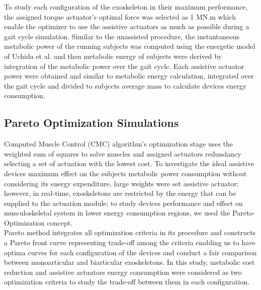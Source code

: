 \documentclass[10pt,letterpaper]{article}
\begin{document}
To study each configuration of the exoskeleton in their maximum performance, the assigned torque actuator's optimal force was selected as 1 MN.m which enable the optimizer to use the assistive actuators as much as possible during a gait cycle simulation. Similar to the unassisted procedure, the instantaneous metabolic power of the running subjects was computed using the energetic model of Uchida et al. \cite{106} and then metabolic energy of subjects were derived by integration of the metabolic power over the gait cycle. Each assistive actuator power were obtained and similar to metabolic energy calculation, integrated over the gait cycle and divided to subjects average mass to calculate devices energy consumption.\\
\subsection*{Pareto Optimization Simulations}
Computed Muscle Control (CMC) algorithm's optimization stage uses the weighted sum of squares to solve muscles and assigned actuators redundancy selecting a set of actuation with the lowest cost. To investigate the ideal assistive devices maximum effect on the subjects metabolic power consumption without considering its energy expenditure, large weights were set assistive actuator; however, in real-time, exoskeletons are restricted by the energy that can be supplied to the actuation module; to study devices performance and effect on musculoskeletal system in lower energy consumption regions, we used the Pareto-Optimization concept\cite{113}.\\
Pareto method integrates all optimization criteria in its procedure and constructs a Pareto front curve representing trade-off among the criteria enabling us to have optima curves for each configuration of the devices \cite{107} and conduct a fair comparison between monoarticular and biarticular exoskeletons. In this study, metabolic cost reduction and assistive actuators energy consumption were considered as two optimization criteria to study the trade-off between them in each configuration.\\
\end{document}
